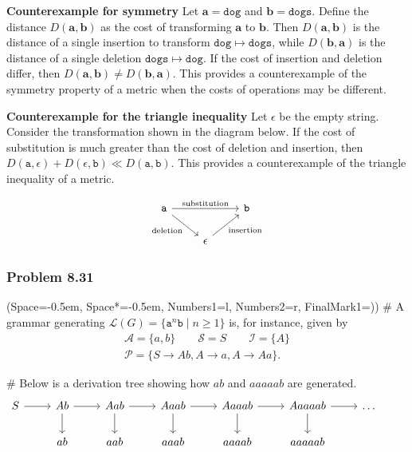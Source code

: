 \documentclass[12pt, a4paper]{article}
\newcommand{\listSpace}{-0.5em}%
\newcommand{\vect}[1]{\bm{#1}}
\begin{document}
{\begin{easylist}[enumerate]
\textbf{Counterexample for symmetry} 
Let $\vect{a} = \mathtt{dog}$ and $\vect{b} = \mathtt{dogs}$.
Define the distance $D(\vect{a}, \vect{b})$ as the cost of transforming $\vect{a}$ to $\vect{b}$.
Then $D(\vect{a}, \vect{b})$ is the distance of a single insertion to transform $\mathtt{dog} \mapsto \mathtt{dogs}$, while $D(\vect{b}, \vect{a})$ is the distance of a single deletion $\mathtt{dogs} \mapsto \mathtt{dog}$.
If the cost of insertion and deletion differ, then $D(\vect{a}, \vect{b}) \neq D(\vect{b}, \vect{a})$.
This provides a counterexample of the symmetry property of a metric when the costs of operations may be different.

\textbf{Counterexample for the triangle inequality} 
Let $\epsilon$ be the empty string.
Consider the transformation shown in the diagram below.
If the cost of substitution is much greater than the cost of deletion and insertion, then $D(\mathtt{a}, \epsilon) + D(\epsilon, \mathtt{b}) \ll D(\mathtt{a}, \mathtt{b})$. 
This provides a counterexample of the triangle inequality of a metric.

\begin{equation*}
\begin{tikzcd}
\mathtt{a} \arrow{rr}{\text{substitution}}
\arrow[swap]{dr}{\text{deletion}} &  & \mathtt{b} \\
 & \epsilon \arrow[swap]{ur}{\text{insertion}}  & 
\end{tikzcd}
\end{equation*}
\end{easylist}




\subsubsection*{Problem 8.31}
\begin{easylist}[enumerate]
	\ListProperties(Space=\listSpace, Space*=\listSpace, Numbers1=l, Numbers2=r, FinalMark1={)})
	# A grammar generating  $\mathcal{L}(G) =
	\{   \mathtt{a}^n \mathtt{b} \mid n \geq 1   \}$ is, for instance, given by
	\begin{gather*}
		\mathcal{A}  = \{a, b\} \qquad \mathcal{S}  = S \qquad
		\mathcal{I}  = \{A\}
		\\
		\mathcal{P}  = \{S \to Ab, A \to a, A \to Aa\}.
	\end{gather*}
	
	# Below is a derivation tree showing how $ab$ and $aaaaab$ are generated.
	\begin{equation*}
	\begin{tikzcd}
	S \arrow{r} & \arrow{r} \arrow{d}  Ab & \arrow{r} \arrow{d} Aab &  \arrow{r} \arrow{d} Aaab & Aaaab \arrow{d} \arrow{r} & Aaaaab \arrow{d} \arrow{r} & \dots  \\
	&  ab & aab & aaab & aaaab & aaaaab & &
	\end{tikzcd}
	\end{equation*}
\end{easylist}


}
\end{document}
